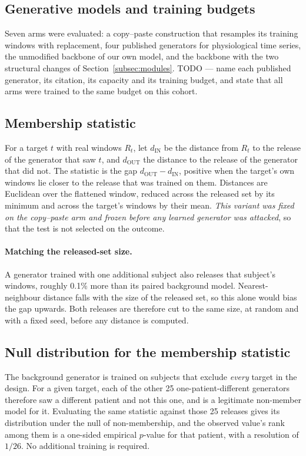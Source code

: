 \documentclass[pdflatex,sn-nature]{sn-jnl}
\theoremstyle{thmstyleone}
\begin{document}
\subsection{Generative models and training budgets}\label{subsec:generators}
Seven arms were evaluated: a copy--paste construction that resamples its training
windows with replacement, four published generators for physiological time
series, the unmodified backbone of our own model, and the backbone with the two
structural changes of Section~\ref{subsec:modules}. TODO --- name each published
generator, its citation, its capacity and its training budget, and state that all
arms were trained to the same budget on this cohort.

\subsection{Membership statistic}\label{subsec:statistic}
For a target $t$ with real windows $R_t$, let $d_{\mathrm{IN}}$ be the distance
from $R_t$ to the release of the generator that saw $t$, and $d_{\mathrm{OUT}}$
the distance to the release of the generator that did not. The statistic is the
gap $d_{\mathrm{OUT}} - d_{\mathrm{IN}}$, positive when the target's own windows
lie closer to the release that was trained on them. Distances are Euclidean over
the flattened window, reduced across the released set by its minimum and across
the target's windows by their mean. \emph{This variant was fixed on the
copy--paste arm and frozen before any learned generator was attacked}, so that
the test is not selected on the outcome.

\paragraph{Matching the released-set size.} A generator trained with one
additional subject also releases that subject's windows, roughly 0.1\% more than
its paired background model. Nearest-neighbour distance falls with the size of
the released set, so this alone would bias the gap upwards. Both releases are
therefore cut to the same size, at random and with a fixed seed, before any
distance is computed.

\subsection{Null distribution for the membership statistic}\label{subsec:floor}
The background generator is trained on subjects that exclude \emph{every}
target in the design. For a given target, each of the other 25
one-patient-different generators therefore saw a different patient and not this
one, and is a legitimate non-member model for it. Evaluating the same statistic
against those 25 releases gives its distribution under the null of
non-membership, and the observed value's rank among them is a one-sided
empirical $p$-value for that patient, with a resolution of $1/26$. No
additional training is required.
\end{document}

